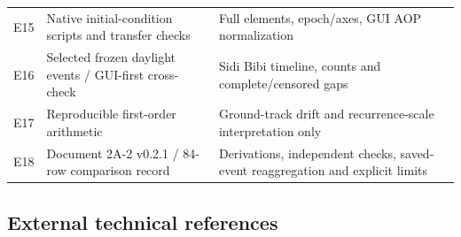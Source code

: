 \documentclass[10pt,a4paper]{article}
\begin{document}
{\begin{tabularx}{\linewidth}{@{}lXX@{}}
E15 & Native initial-condition scripts and transfer checks & Full elements, epoch/axes, GUI AOP normalization\\
\rowcolor{rowalt}E16 & Selected frozen daylight events / GUI-first cross-check & Sidi Bibi timeline, counts and complete/censored gaps\\
E17 & Reproducible first-order arithmetic & Ground-track drift and recurrence-scale interpretation only\\
\rowcolor{rowalt}E18 & Document 2A-2 v0.2.1 / 84-row comparison record & Derivations, independent checks, saved-event reaggregation and explicit limits\\\bottomrule\end{tabularx}}

\subsection{External technical references}
\end{document}
